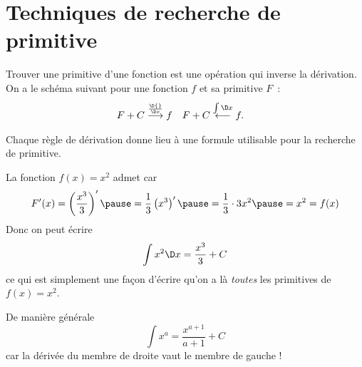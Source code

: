 \section{Techniques de recherche de primitive}
\begin{frame}
  \tableofcontents[currentsection]
\end{frame}
\begin{frame}
  Trouver une primitive d'une fonction est une opération qui inverse la dérivation. On a le schéma suivant pour une fonction $f$ et sa primitive $F$~:
  \begin{align*}
    F + C &\stackrel{\frac{\D{}}{\D x}}{\longrightarrow} f&
                                                            F + C &\stackrel{\int \D x}{\longleftarrow} f.
  \end{align*}
\end{frame}

\begin{frame}
  Chaque règle de dérivation donne lieu à une formule utilisable pour la recherche de primitive.
  \begin{example}
    La fonction $f(x) = x^2$ admet car\pause{}\pause{}
    \begin{equation*}
      F'(x) = \left( \frac{x^3}{3} \right)' \pause= \frac{1}{3} \left( x^3 \right)'
      \pause= \frac{1}{3} \cdot 3x^2 \pause= x^2 = f(x)
    \end{equation*}\pause{}
    Donc on peut écrire
    \begin{equation*}
      \int x^2 \D x = \frac{x^3}{3} + C
    \end{equation*}\pause{}
    ce qui est simplement une fa\c{c}on d'écrire qu'on a là \emph{toutes} les primitives de $f(x) = x^2$.
  \end{example}
  \begin{example}\pause{}
    De manière générale\pause{}
    \begin{equation*}
      \int x^{a} = \frac{x^{a+1}}{a+1} + C
    \end{equation*}\pause{}
    car la dérivée du membre de droite vaut le membre de gauche !
  \end{example}
\end{frame}


